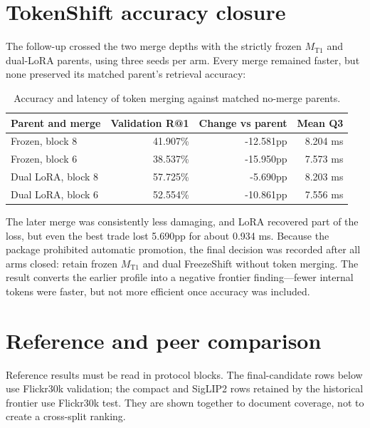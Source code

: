 \documentclass[11pt,a4paper,oneside]{report}
\newcommand{\MTone}{\ensuremath{M_{\mathrm{T1}}}}
\begin{document}
\section{TokenShift accuracy closure}
The follow-up crossed the two merge depths with the strictly frozen \MTone{} and dual-LoRA parents, using three seeds per arm. Every merge remained faster, but none preserved its matched parent's retrieval accuracy:

\begin{table}[htbp]
\centering
\caption{Accuracy and latency of token merging against matched no-merge parents.}
\label{tab:tokenshift-accuracy}
\begin{tabular}{L{4.5cm}rrr}
\toprule
Parent and merge & Validation R@1 & Change vs parent & Mean Q3 \\
\midrule
Frozen, block 8 & 41.907\% & -12.581pp & 8.204 ms \\
Frozen, block 6 & 38.537\% & -15.950pp & 7.573 ms \\
Dual LoRA, block 8 & 57.725\% & -5.690pp & 8.203 ms \\
Dual LoRA, block 6 & 52.554\% & -10.861pp & 7.556 ms \\
\bottomrule
\end{tabular}
\end{table}
The later merge was consistently less damaging, and LoRA recovered part of the loss, but even the best trade lost 5.690pp for about 0.934 ms. Because the package prohibited automatic promotion, the final decision was recorded after all arms closed: retain frozen \MTone{} and dual FreezeShift without token merging. The result converts the earlier profile into a negative frontier finding---fewer internal tokens were faster, but not more efficient once accuracy was included.

\section{Reference and peer comparison}
Reference results must be read in protocol blocks. The final-candidate rows below use Flickr30k validation; the compact and SigLIP2 rows retained by the historical frontier use Flickr30k test. They are shown together to document coverage, not to create a cross-split ranking.
\end{document}
